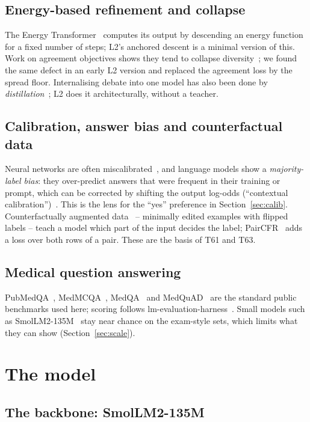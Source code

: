 \documentclass[a4paper,11pt,parskip=half]{scrartcl}
\begin{document}
\subsection{Energy-based refinement and collapse}
The Energy Transformer~\cite{hoover2023energy} computes its output by descending
an energy function for a fixed number of steps; L2's anchored descent is a
minimal version of this. Work on agreement objectives shows they tend to
collapse diversity~\cite{li2026collapse}; we found the same defect in an early
L2 version and replaced the agreement loss by the spread floor. Internalising
debate into one model has also been done by \emph{distillation}~\cite{yi2026latent};
L2 does it architecturally, without a teacher.

\subsection{Calibration, answer bias and counterfactual data}
Neural networks are often miscalibrated~\cite{guo2017calibration}, and language
models show a \emph{majority-label bias}: they over-predict answers that were
frequent in their training or prompt, which can be corrected by shifting the
output log-odds (``contextual calibration'')~\cite{zhao2021calibrate}. This is
the lens for the ``yes'' preference in Section~\ref{sec:calib}.
Counterfactually augmented data~\cite{kaushik} -- minimally edited
examples with flipped labels -- teach a model which part of the input decides
the label; PairCFR~\cite{paircfr} adds a loss over both rows of a pair. These
are the basis of T61 and T63.

\subsection{Medical question answering}
PubMedQA~\cite{pubmedqa}, MedMCQA~\cite{medmcqa}, MedQA~\cite{medqa} and
MedQuAD~\cite{medquad} are the standard public benchmarks used here; scoring
follows lm-evaluation-harness~\cite{lmeval}. Small models such as
SmolLM2-135M~\cite{smollm2} stay near chance on the exam-style sets, which limits
what they can show (Section~\ref{sec:scale}).

\section{The model}

\subsection{The backbone: SmolLM2-135M}
\end{document}
